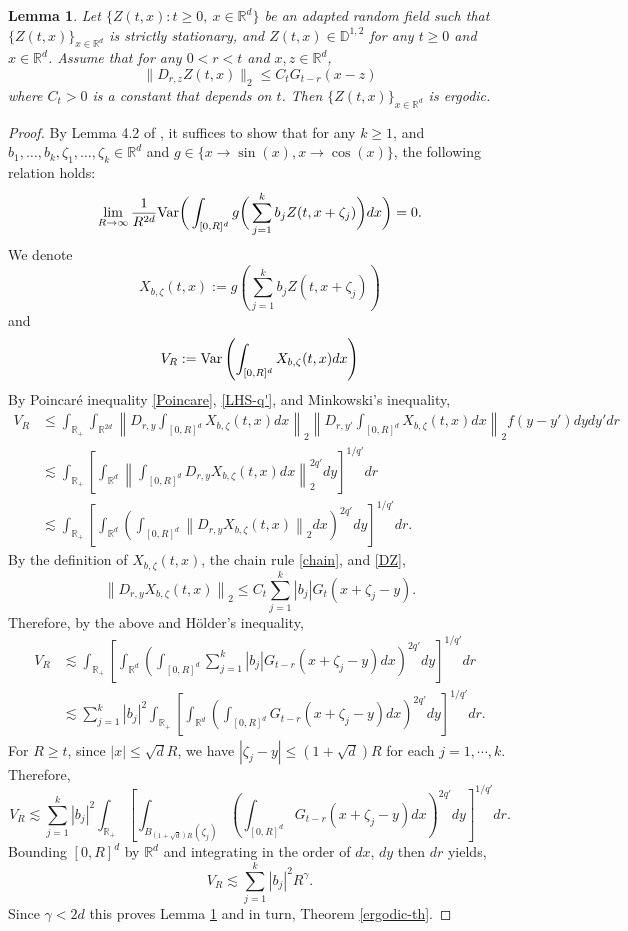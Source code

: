 \documentclass[12pt]{article}
\newtheorem{lemma}[theorem]{Lemma}
\def\bD{\mathbb{D}}
\def\bR{\mathbb{R}}
\newcommand{\les}{\lesssim}
\begin{document}
\begin{lemma}\label{ergodicity}
Let $\{Z(t,x) : t \geq 0,\ x \in \bR^d \}$ be an adapted random field such that $\{ Z(t,x)\}_{x \in \bR^d}$ is strictly stationary, and $Z(t,x) \in \bD^{1,2}$ for any $t \geq 0$ and $x \in \bR^d$. Assume that for any $0 < r < t$ and $x,z \in \bR^d$,
\begin{equation}\label{DZ}
\| D_{r,z}Z(t,x)\|_2 \leq C_t G_{t-r}(x-z)
\end{equation}
where $C_t > 0$ is a constant that depends on $t$. Then $\{ Z(t,x)\}_{x \in \bR^d}$ is ergodic.
\end{lemma}
\begin{proof} By Lemma 4.2 of \cite{BZ24}, it suffices to show that for any $k\geq 1$, and $b_1, \ldots , b_k, \zeta_1, \ldots, \zeta_k\in\bR^d$ and $g \in \{x \to \sin(x), x \to \cos(x)\}$, the following relation holds:
\begin{align}
\label{ERG1}
\lim_{R\to\infty} \frac{1}{R^{2d}}
{\rm Var}\bigg(  \int_{[0,R]^d} g \bigg(\sum_{j=1}^k b_j  Z(t,x + \zeta_j)  \bigg) dx \bigg)
=0.
\end{align}
We denote 
\[
X_{b,\zeta}(t,x) := g \left(\sum_{j=1}^k b_j  Z(t,x + \zeta_j)  \right)
\]
and 
\[
 V_R := {\rm Var}\left(  \int_{[0,R]^d} X_{b,\zeta}(t,x) dx \right)
\]
By Poincar\'e inequality \eqref{Poincare}, \eqref{LHS-q'}, and Minkowski's inequality,
\begin{align*}
V_R & \leq \int_{\bR_+} \int_{\bR^{2d}} \left\| D_{r,y}\int_{[0,R]^d} X_{b,\zeta}(t,x) dx  \right\|_2 \left\| D_{r,y'}\int_{[0,R]^d} X_{b,\zeta}(t,x) dx  \right\|_2 f(y-y') dydy'dr \\
 & \les \int_{\bR_+} \left[\int_{\bR^{d}} \left\| \int_{[0,R]^d} D_{r,y}X_{b,\zeta}(t,x) dx  \right\|_2^{2q'} dy\right]^{1/q'} dr \\
 & \les \int_{\bR_+} \left[\int_{\bR^{d}} \left( \int_{[0,R]^d} \left\| D_{r,y}X_{b,\zeta}(t,x)  \right\|_2 dx\right) ^{2q'} dy\right]^{1/q'} dr.
\end{align*}
By the definition of $X_{b,\zeta}(t,x)$, the chain rule \eqref{chain}, and \eqref{DZ},
\[
 \left\| D_{r,y}X_{b,\zeta}(t,x)  \right\|_2 \leq C_t\sum_{j=1}^k |b_j|  G_t(x + \zeta_j - y).
\]
Therefore, by the above and H\"older's inequality, 
\begin{align*}
V_R & \les  \int_{\bR_+} \left[\int_{\bR^{d}} \left( \int_{[0,R]^d} \sum_{j=1}^k |b_j| G_{t-r}(x + \zeta_j - y) dx\right) ^{2q'} dy\right]^{1/q'} dr \\
 & \les \sum_{j=1}^k |b_j|^2 \int_{\bR_+} \left[\int_{\bR^{d}} \left( \int_{[0,R]^d} G_{t-r}(x + \zeta_j - y) dx\right) ^{2q'} dy\right]^{1/q'} dr.
\end{align*}
For $R \geq t$, since $|x| \leq \sqrt{d}R$, we have $|\zeta_j - y| \leq (1+\sqrt{d})R$ for each $j = 1,\cdots,k$. Therefore,
\[
V_R \les \sum_{j=1}^k |b_j|^2 \int_{\bR_+} \left[\int_{B_{(1+\sqrt{d})R}(\zeta_j)} \left( \int_{[0,R]^d} G_{t-r}(x + \zeta_j - y) dx\right) ^{2q'} dy\right]^{1/q'} dr.
\]
Bounding $[0,R]^d$ by $\bR^d$ and integrating in the order of $dx$, $dy$ then $dr$ yields, 
\[
V_R \les \sum_{j=1}^k |b_j|^2 R^{\gamma}.
\]
Since $\gamma < 2d$ this proves Lemma \ref{ergodicity} and in turn, Theorem \ref{ergodic-th}. 
\end{proof}
\end{document}
